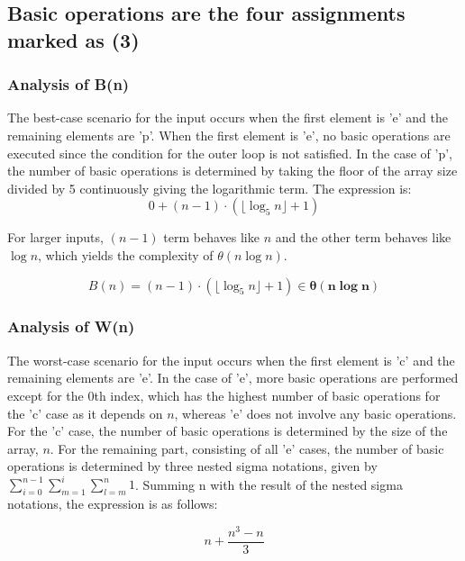 \documentclass[11pt, oneside, a4paper]{article}
\begin{document}
	\subsection{Basic operations are the four assignments marked as (3)}

\subsubsection{Analysis of B(n)}

The best-case scenario for the input occurs when the first element is 'e' and the remaining elements are 'p'. When the first element is 'e', no basic operations are executed since the condition for the outer loop is not satisfied. In the case of 'p', the number of basic operations is determined by taking the floor of the array size divided by 5 continuously giving the logarithmic term. The expression is:
\begin{equation*}
0 + (n-1) \cdot \left( \lfloor \log_5 n \rfloor + 1 \right)
\end{equation*}

For larger inputs, \( (n-1) \) term behaves like \( n \) and the other term behaves like \( \log n \), which yields the complexity of $\theta(n \log n)$.

\[
B(n) = (n-1) \cdot \left( \lfloor \log_5 n \rfloor + 1 \right) \in \boldsymbol{\theta(n \log n)}
\]


\subsubsection{Analysis of W(n)}

The worst-case scenario for the input occurs when the first element is 'c' and the remaining elements are 'e'. In the case of 'e', more basic operations are performed except for the 0th index, which has the highest number of basic operations for the 'c' case as it depends on \( n \), whereas 'e' does not involve any basic operations. For the 'c' case, the number of basic operations is determined by the size of the array, \( n \). For the remaining part, consisting of all 'e' cases, the number of basic operations is determined by three nested sigma notations, given by \( \sum_{i=0}^{n-1} \sum_{m=1}^{i} \sum_{l=m}^{n} 1 \). Summing n with the result of the nested sigma notations, the expression is as follows:


\begin{equation*}
n+ \frac{n^3 - n}{3} 
\end{equation*}
\end{document}
